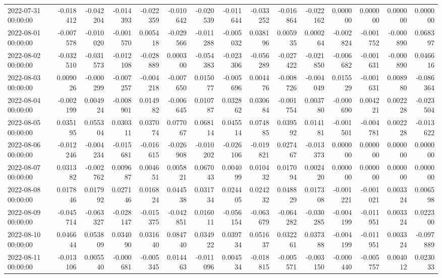 \begin{tabular}{lrrrrrrrrrrrrrr}
2022-07-31 00:00:00 & -0.018412 & -0.042204 & -0.014393 & -0.022359 & -0.010642 & -0.020539 & -0.011644 & -0.033252 & -0.016864 & -0.022162 & 0.000000 & 0.000000 & 0.000000 & 0.000000 \\
2022-08-01 00:00:00 & -0.007578 & -0.010020 & -0.001570 & 0.005418 & -0.029566 & -0.011288 & -0.005032 & 0.038196 & 0.005935 & 0.000264 & -0.002824 & -0.001752 & -0.000890 & 0.068397 \\
2022-08-02 00:00:00 & -0.032510 & -0.031573 & -0.012108 & -0.028889 & 0.000300 & -0.054383 & -0.023306 & -0.056289 & -0.027422 & -0.021850 & -0.006682 & -0.001631 & -0.000890 & 0.046616 \\
2022-08-03 00:00:00 & 0.009026 & -0.000299 & -0.007257 & -0.004218 & -0.007650 & 0.015077 & -0.005696 & 0.004476 & -0.008726 & -0.004049 & 0.015529 & -0.001631 & 0.008980 & -0.086364 \\
2022-08-04 00:00:00 & -0.002199 & 0.004924 & -0.008901 & 0.014982 & -0.006645 & 0.010787 & 0.032862 & 0.030684 & -0.001754 & 0.003780 & -0.000690 & 0.004221 & 0.002228 & -0.023504 \\
2022-08-05 00:00:00 & 0.035195 & 0.055304 & 0.030311 & 0.037074 & 0.077067 & 0.068114 & 0.045514 & 0.074885 & 0.039592 & 0.014181 & -0.001501 & -0.004781 & 0.002228 & -0.013622 \\
2022-08-06 00:00:00 & -0.012246 & -0.004234 & -0.015681 & -0.016615 & -0.026908 & -0.010202 & -0.026106 & -0.019821 & 0.027467 & -0.013373 & 0.000000 & 0.000000 & 0.000000 & 0.000000 \\
2022-08-07 00:00:00 & 0.031382 & -0.002762 & 0.009687 & 0.004651 & 0.005821 & 0.067043 & 0.004099 & 0.010432 & 0.017094 & 0.002420 & 0.000000 & 0.000000 & 0.000000 & 0.000000 \\
2022-08-08 00:00:00 & 0.017846 & 0.017992 & 0.027146 & 0.016824 & 0.044538 & 0.031734 & 0.024405 & 0.024232 & 0.048829 & 0.017308 & -0.001221 & -0.001021 & 0.003324 & 0.006598 \\
2022-08-09 00:00:00 & -0.045714 & -0.063327 & -0.028147 & -0.015375 & -0.042851 & 0.016011 & -0.056154 & -0.063679 & -0.064282 & -0.030285 & -0.004199 & -0.011951 & 0.003324 & 0.022300 \\
2022-08-10 00:00:00 & 0.046644 & 0.053809 & 0.034090 & 0.031640 & 0.084740 & 0.034922 & 0.039734 & 0.051637 & 0.032261 & 0.037388 & -0.004199 & -0.011951 & 0.003324 & -0.097889 \\
2022-08-11 00:00:00 & -0.013106 & 0.005540 & -0.000681 & -0.005345 & 0.014463 & -0.011096 & 0.004534 & -0.018815 & -0.005571 & -0.003150 & -0.000440 & -0.005757 & 0.004012 & 0.023033 \\

\end{tabular}

